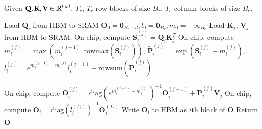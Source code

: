 \begin{algorithm}[H]
\caption{Flash Attention-2 via online softmax (Dao 2024)}
\label{alg:flashattention}
Given $\mathbf{Q}, \mathbf{K}, \mathbf{V} \in \mathbb{R}^{L\times d}$, $T_c$, $T_r$ row blocks of size $B_r$, $T_c$ column blocks of size $B_c$.

\begin{algorithmic}[1]
    \State Load $\mathbf{Q}_i$ from HBM to SRAM
    \State $\mathbf{O}_0 = \mathbf{0}_{B_r\times d}, l_0 = \mathbf{0}_{B_r}, m_0 = -\mathbf{\infty}_{B_r}$
        \State Load $\mathbf{K}_j$, $\mathbf{V}_j$ from HBM to SRAM.
        \State On chip, compute $\mathbf{S}_i^{(j)} = \mathbf{Q}_i\mathbf{K}_j^T$
        \State On chip, compute $m_i^{(j)} = \max\left(m_i^{(j-1)}, \textrm{rowmax}\left(\mathbf{S}_i^{(j)}\right)\right)$, $\tilde{\mathbf{P}}_i^{(j)} = \exp\left(\mathbf{S}_i^{(j)} - m_i^{(j)}\right)$, $l_i^{(j)}=e^{m_i^{(j-1)}-m_i^{(j)}}l_i^{(j-1)} + \textrm{rowsum}\left(\tilde{\mathbf{P}}_i^{(j)}\right)$

        \State On chip, compute $\mathbf{O}_i^{(j)}=\textrm{diag}\left(e^{m_i^{(j-1)}-m_i^{(j)}}\right)^{-1}\mathbf{O}_i^{(j-1)} + \tilde{\mathbf{P}}_i^{(j)}\mathbf{V}_j$
    \EndFor
    \State On chip, compute $\mathbf {O}_i=\textrm{diag}\left(l_i^{(T_c)}\right)^{-1}\mathbf {O}_i^{(T_c)}$
    \State Write $\mathbf{O}_i$ to HBM as $i$th block of $\mathbf{O}$
\EndFor
\State Return $\mathbf{O}$
\end{algorithmic}
\end{algorithm}